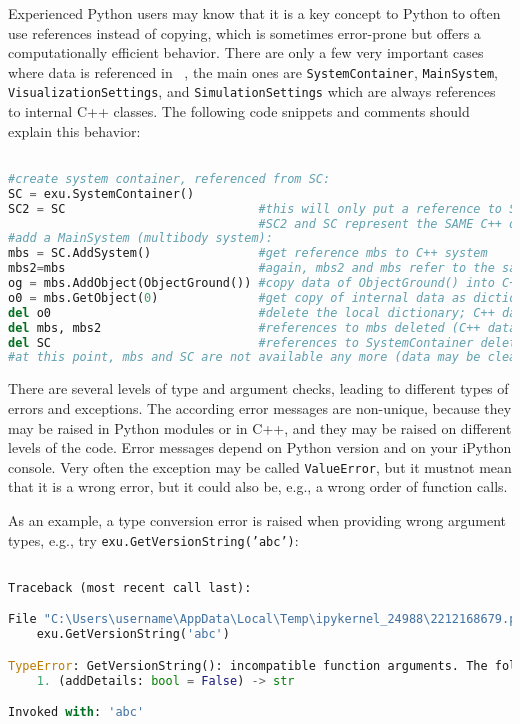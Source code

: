 Experienced Python users may know that it is a key concept to Python to often use references instead of copying, which is
sometimes error-prone but offers a computationally efficient behavior.
There are only a few very important cases where data is referenced in \codeName\ , the main ones are 
\texttt{SystemContainer}, 
\texttt{MainSystem}, 
\texttt{VisualizationSettings}, and
\texttt{SimulationSettings} which are always references to internal C++ classes.
The following code snippets and comments should explain this behavior:
\pythonstyle
\begin{lstlisting}[language=Python, firstnumber=1]

#create system container, referenced from SC:
SC = exu.SystemContainer()
SC2 = SC                           #this will only put a reference to SC
                                   #SC2 and SC represent the SAME C++ object
#add a MainSystem (multibody system):
mbs = SC.AddSystem()               #get reference mbs to C++ system
mbs2=mbs                           #again, mbs2 and mbs refer to the same C++ object
og = mbs.AddObject(ObjectGround()) #copy data of ObjectGround() into C++
o0 = mbs.GetObject(0)              #get copy of internal data as dictionary
del o0                             #delete the local dictionary; C++ data not affected
del mbs, mbs2                      #references to mbs deleted (C++ data still available)
del SC                             #references to SystemContainer deleted
#at this point, mbs and SC are not available any more (data may be cleaned up by Python)
\end{lstlisting}


\label{sec:cinterface:exceptions}
There are several levels of type and argument checks, leading to different types of errors and exceptions. The according error messages are non-unique, because they may be raised in Python modules or in C++, and they may be raised on different levels of the code. Error messages depend on Python version and on your iPython console. Very often the exception may be called \texttt{ValueError}, but it mustnot mean that it is a wrong error, but it could also be, e.g., a wrong order of function calls.

As an example, a type conversion error is raised when providing wrong argument types, e.g., try \texttt{exu.GetVersionString('abc')}:
\pythonstyle
\begin{lstlisting}[language=Python, firstnumber=1]

Traceback (most recent call last):

File "C:\Users\username\AppData\Local\Temp\ipykernel_24988\2212168679.py", line 1, in <module>
    exu.GetVersionString('abc')

TypeError: GetVersionString(): incompatible function arguments. The following argument types are supported:
    1. (addDetails: bool = False) -> str

Invoked with: 'abc'
\end{lstlisting}


